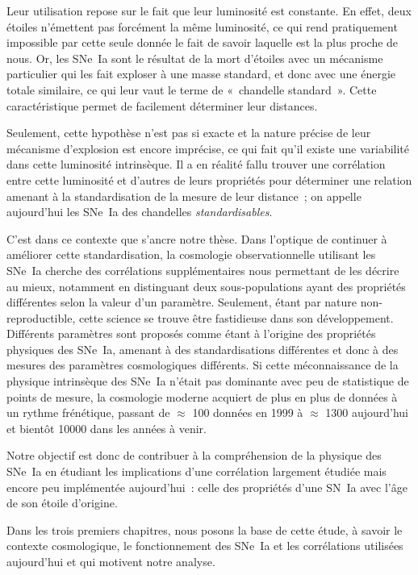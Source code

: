 \documentclass[../main/main.tex]{subfiles}
\begin{document}
Leur utilisation repose sur le fait que leur luminosité est constante. En effet,
deux étoiles n'émettent pas forcément la même luminosité, ce qui rend
pratiquement impossible par cette seule donnée le fait de savoir laquelle est la
plus proche de nous. Or, les SNe~Ia sont le résultat de la mort d'étoiles
avec un mécanisme particulier qui les fait exploser à une masse standard, et
donc avec une énergie totale similaire, ce qui leur vaut le terme de «~chandelle
standard~». Cette caractéristique permet de facilement déterminer leur
distances.

Seulement, cette hypothèse n'est pas si exacte et la nature précise de leur
mécanisme d'explosion est encore imprécise, ce qui fait qu'il existe une
variabilité dans cette luminosité intrinsèque. Il a en réalité fallu trouver une
corrélation entre cette luminosité et d'autres de leurs propriétés pour
déterminer une relation amenant à la standardisation de la mesure de leur
distance~; on appelle aujourd'hui les SNe~Ia des chandelles
\textit{standardisables}.

C'est dans ce contexte que s'ancre notre thèse. Dans l'optique de continuer à
améliorer cette standardisation, la cosmologie observationnelle utilisant les
SNe~Ia cherche des corrélations supplémentaires nous permettant de les décrire
au mieux, notamment en distinguant deux sous-populations ayant des propriétés
différentes selon la valeur d'un paramètre. Seulement, étant par nature
non-reproductible, cette science se trouve être fastidieuse dans son
développement. Différents paramètres sont proposés comme étant à l'origine des
propriétés physiques des SNe~Ia, amenant à des standardisations différentes et
donc à des mesures des paramètres cosmologiques différents. Si cette
méconnaissance de la physique intrinsèque des SNe~Ia n'était pas dominante avec
peu de statistique de points de mesure, la cosmologie moderne acquiert de plus
en plus de données à un rythme frénétique, passant de $\approx$ 100 données en
1999 à $\approx$ \num{1300} aujourd'hui et bientôt \num{10000} dans les années à
venir.

Notre objectif est donc de contribuer à la compréhension de la physique des
SNe~Ia en étudiant les implications d'une corrélation largement étudiée mais
encore peu implémentée aujourd'hui~: celle des propriétés d'une SN~Ia avec l'âge
de son étoile d'origine.

Dans les trois premiers chapitres, nous posons la base de cette étude, à savoir
le contexte cosmologique, le fonctionnement des SNe~Ia et les corrélations
utilisées aujourd'hui et qui motivent notre analyse.
\end{document}
